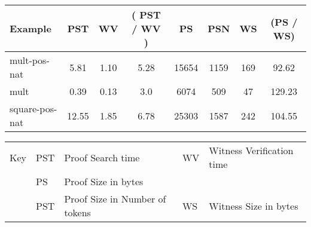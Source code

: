 \documentclass{llncs}
\begin{document}
\begin{table*}[htbp]
\begin{center}
\begin{small}
\begin{tabular}{|l|c|c|c|c|c|c|c|}
\hline
Example & PST 
& WV & ( PST / WV ) & PS & PSN & WS & (PS / WS)\\
\hline
mult-pos-nat & 5.81 & 1.10 & 5.28
& 15654 & 1159 & 169 & 92.62\\
mult & 0.39 & 0.13 & 3.0 
& 6074 & 509 & 47 & 129.23\\
square-pos-nat & 12.55 & 1.85 & 6.78 
& 25303 & 1587 & 242 & 104.55\\
\hline
\end{tabular}
\begin{tabular}{ll@{=}ll@{=}l}
Key & PST & Proof Search time
&WV & Witness Verification time\\ 
&PS & Proof Size in bytes\\
&PST & Proof Size in Number of tokens 
&WS & Witness Size in bytes\\
\end{tabular} 
\end{small}
\end{center}
\caption{\label{tab:reftimes} Refinement Type System : 
Proof Compression Times with Caching}
\end{table*}

\end{document}
